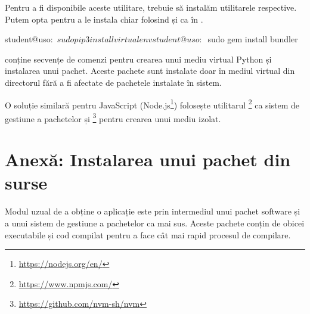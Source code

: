 Pentru a fi disponibile aceste utilitare, trebuie să instalăm utilitarele respective.
Putem opta pentru a le instala chiar folosind  și  ca în .

\begin{screen}[caption={Instalarea utilitarelor virtualenv și rvm},label={lst:package:install-venv-bundler}]
student@uso:~$ sudo pip3 install virtualenv

student@uso:~$ sudo gem install bundler
\end{screen}

 conține secvențe de comenzi pentru crearea unui mediu virtual Python și instalarea unui pachet.
Aceste pachete sunt instalate doar în mediul virtual din directorul  fără a fi afectate de pachetele instalate în sistem.


O soluție similară pentru JavaScript (Node.js\footnote{\url{https://nodejs.org/en/}}) folosește utilitarul \footnote{\url{https://www.npmjs.com/}} ca sistem de gestiune a pachetelor și \footnote{\url{https://github.com/nvm-sh/nvm}} pentru crearea unui mediu izolat.

\section{Anexă: Instalarea unui pachet din surse}
\label{sec:package:source}

Modul uzual de a obține o aplicație este prin intermediul unui pachet software și a unui sistem de gestiune a pachetelor ca mai sus.
Aceste pachete conțin de obicei executabile și cod compilat pentru a face cât mai rapid procesul de compilare.

